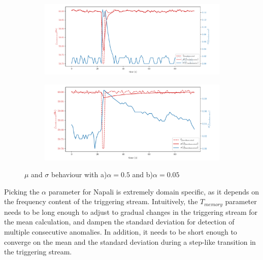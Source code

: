 \begin{figure}[h]
    \centering
    \begin{subfigure}{0.9\textwidth}
        \centering
        \includegraphics[width=1\linewidth]{img/napali_eval/Napali_response_freq_05.pdf}
        \caption{}
        \label{fig:expdes:5:1}
    \end{subfigure}%

    \begin{subfigure}{0.9\textwidth}
        \centering
        \includegraphics[width=1\linewidth]{img/napali_eval/Napali_response_freq_005.pdf}
        \caption{}
        \label{fig:expdes:5:2}
    \end{subfigure}
    \caption{$\mu$ and $\sigma$ behaviour with a)$\alpha = 0.5$ and b)$\alpha=0.05$}
    \label{fig:expdes:5}
\end{figure}

Picking the $\alpha$ parameter for Napali is extremely domain specific, as it depends on the frequency content of the triggering stream.
Intuitively, the $T_{memory}$ parameter needs to be long enough to adjust to gradual changes in the triggering stream for the mean calculation,
and dampen the standard deviation for detection of multiple consecutive anomalies.
In addition, it needs to be short enough to converge on the mean and the standard deviation during a step-like transition in the triggering stream.

